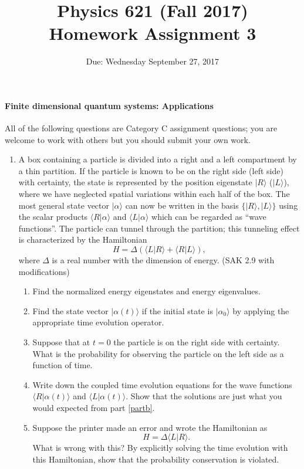 \documentclass[letterpaper,11pt]{article}
\title{Physics 621 (Fall 2017) \\ Homework Assignment 3}
\date{Due: Wednesday September 27, 2017}
\begin{document}
\maketitle

\paragraph*{Finite dimensional quantum systems: Applications}

All of the following questions are Category C assignment questions; you are welcome to work with others but you should submit your own work.

\begin{enumerate}
  \item A box containing a particle is divided into a right and a left compartment by a thin partition. If the particle is known to be on the right side (left side) with certainty, the state is represented by the position eigenstate $|R\rangle$ ($|L\rangle$), where we have neglected spatial variations within each half of the box. The most general state vector $|\alpha\rangle$ can now be written in the basis $\{|R\rangle,|L\rangle\}$ using the scalar products $\langle R|\alpha\rangle$ and $\langle L|\alpha\rangle$ which can be regarded as ``wave functions''. The particle can tunnel through the partition; this tunneling effect is characterized by the Hamiltonian
  $$ H = \Delta ( \langle L|R\rangle + \langle R|L\rangle ), $$
  where $\Delta$ is a real number with the dimension of energy. (SAK 2.9 with modifications)
  \begin{enumerate}
    \item Find the normalized energy eigenstates and energy eigenvalues.
    \item \label{partb} Find the state vector $|\alpha(t)\rangle$ if the initial state is $|\alpha_0\rangle$ by applying the appropriate time evolution operator.
    \item Suppose that at $t = 0$ the particle is on the right side with certainty. What is the probability for observing the particle on the left side as a function of time.
    \item Write down the coupled time evolution equations for the wave functions $\langle R|\alpha(t)\rangle$ and $\langle L|\alpha(t)\rangle$. Show that the solutions are just what you would expected from part \ref{partb}.
    \item Suppose the printer made an error and wrote the Hamiltonian as
    $$ H = \Delta \langle L|R\rangle. $$
    What is wrong with this? By explicitly solving the time evolution with this Hamiltonian, show that the probability conservation is violated.

\end{enumerate}
\end{enumerate}
\end{document}
